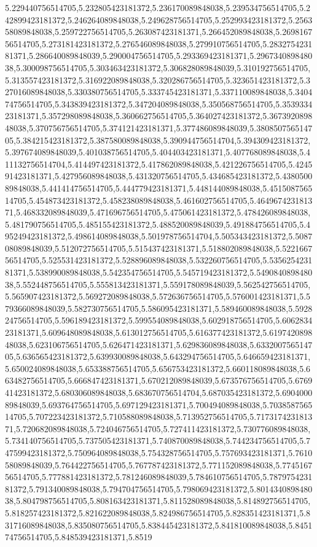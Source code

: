 5.229440756514705,5.232805423181372,5.236170089848038,5.239534756514705,5.242899423181372,5.246264089848038,5.249628756514705,5.252993423181372,5.256358089848038,5.259722756514705,5.263087423181371,5.266452089848038,5.269816756514705,5.273181423181372,5.276546089848038,5.279910756514705,5.283275423181371,5.286640089848039,5.290004756514705,5.293369423181371,5.296734089848038,5.300098756514705,5.303463423181372,5.306828089848039,5.310192756514705,5.313557423181372,5.316922089848038,5.320286756514705,5.323651423181372,5.327016089848038,5.330380756514705,5.333745423181371,5.337110089848038,5.340474756514705,5.343839423181372,5.347204089848038,5.350568756514705,5.353933423181371,5.357298089848038,5.360662756514705,5.364027423181372,5.367392089848038,5.370756756514705,5.374121423181371,5.377486089848039,5.380850756514705,5.384215423181372,5.387580089848038,5.390944756514704,5.394309423181372,5.397674089848039,5.401038756514705,5.404403423181371,5.407768089848038,5.411132756514704,5.414497423181372,5.417862089848038,5.421226756514705,5.424591423181371,5.427956089848038,5.431320756514705,5.434685423181372,5.438050089848038,5.441414756514705,5.444779423181371,5.448144089848038,5.451508756514705,5.454873423181372,5.458238089848038,5.461602756514705,5.464967423181371,5.468332089848039,5.471696756514705,5.475061423181372,5.478426089848038,5.481790756514705,5.485155423181372,5.488520089848039,5.491884756514705,5.495249423181372,5.498614089848038,5.501978756514704,5.505343423181372,5.508708089848039,5.512072756514705,5.515437423181371,5.518802089848038,5.522166756514705,5.525531423181372,5.528896089848038,5.532260756514705,5.535625423181371,5.538990089848038,5.542354756514705,5.545719423181372,5.549084089848038,5.552448756514705,5.555813423181371,5.559178089848039,5.562542756514705,5.565907423181372,5.569272089848038,5.572636756514705,5.576001423181371,5.579366089848039,5.582730756514705,5.586095423181371,5.589460089848038,5.592824756514705,5.596189423181372,5.599554089848038,5.602918756514705,5.606283423181371,5.609648089848038,5.613012756514705,5.616377423181372,5.619742089848038,5.623106756514705,5.626471423181371,5.629836089848038,5.633200756514705,5.636565423181372,5.639930089848038,5.643294756514705,5.646659423181371,5.650024089848038,5.653388756514705,5.656753423181372,5.660118089848038,5.663482756514705,5.666847423181371,5.670212089848039,5.673576756514705,5.676941423181372,5.680306089848038,5.683670756514704,5.687035423181372,5.690400089848039,5.693764756514705,5.697129423181371,5.700494089848038,5.703858756514705,5.707223423181372,5.710588089848038,5.713952756514705,5.717317423181371,5.720682089848038,5.724046756514705,5.727411423181372,5.730776089848038,5.734140756514705,5.737505423181371,5.740870089848038,5.744234756514705,5.747599423181372,5.750964089848038,5.754328756514705,5.757693423181371,5.761058089848039,5.764422756514705,5.767787423181372,5.771152089848038,5.774516756514705,5.777881423181372,5.781246089848039,5.784610756514705,5.787975423181372,5.791340089848038,5.794704756514705,5.798069423181372,5.801434089848038,5.804798756514705,5.808163423181371,5.811528089848038,5.814892756514705,5.818257423181372,5.821622089848038,5.824986756514705,5.828351423181371,5.831716089848038,5.835080756514705,5.838445423181372,5.841810089848038,5.845174756514705,5.848539423181371,5.8519